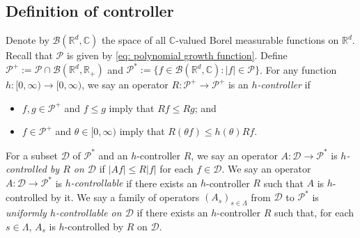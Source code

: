 \documentclass[12pt,a4paper]{amsart}
\theoremstyle{plain}
\theoremstyle{definition}
\numberwithin{equation}{section}
\begin{document}
\subsection{Definition of controller}
	Denote by $\mathcal B(\mathbb R^d, \mathbb C)$ the space of all $\mathbb C$-valued Borel measurable functions on $\mathbb R^d$.
	Recall that $\mathcal P$ is given by \eqref{eq: polynomial growth function}.
    Define $\mathcal P^+:= \mathcal P \cap \mathcal B(\mathbb R^d, \mathbb R_+)$ and $\mathcal P^*:= \{f\in \mathcal B(\mathbb R^d, \mathbb C): |f|\in \mathcal P\}$.
    For any function $h: [0,\infty) \to [0,\infty)$, we say an operator $R: \mathcal P^+ \to \mathcal P^+$ is an \emph{$h$-controller} if
\begin{itemize}
\item
    $f, g\in \mathcal P^+$ and $f\leq g$ imply that $Rf \leq Rg$; and
\item
    $f \in \mathcal P^+$ and $\theta \in [0,\infty)$ imply that $ R (\theta f)\leq h(\theta) Rf$.
\end{itemize}
    For a subset $\mathcal D$ of $\mathcal P^*$ and an $h$-controller $R$, we say an operator $A : \mathcal D \to \mathcal P^*$ is \emph{$h$-controlled by $R$ on $\mathcal D$} if $|Af| \leq R|f|$ for each $f\in \mathcal D$.
    We say an operator $A : \mathcal D \to \mathcal P^*$ is \emph{$h$-controllable} if there exists an $h$-controller $R$ such that $A$ is $h$-controlled by it.
     We say a family of operators $(A_s)_{s\in \Lambda}$ from $\mathcal D $ to $\mathcal P^*$ is \emph{uniformly $h$-controllable on $\mathcal D$} if there exists an $h$-controller $R$ such that, for each $s\in \Lambda$, $A_s$ is $h$-controlled by $R$ on $\mathcal D$.
     
\end{document}

